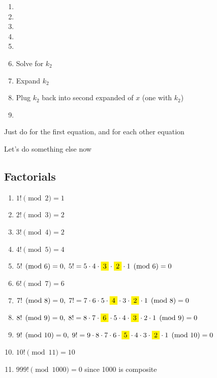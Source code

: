 \documentclass[../../Main.tex]{subfiles}
\begin{document}
\begin{enumerate}
    \item {}
    \item {}
    \item {}
    \item {}
    \item {}
    \item Solve for $k_2$
    \item Expand $k_2$
    \item Plug $k_2$ back into second expanded of $x$ (one with $k_2$)
    \item {}
\end{enumerate}

Just do  for the first equation, and  for each other equation

Let's do something else now

\subsection{Factorials}

\begin{enumerate}
    \item $1! \pmod{2} = 1$
    \item $2! \pmod{3} = 2$
    \item $3! \pmod{4} = 2$
    \item $4! \pmod{5} = 4$
    \item $5! \pmod{6} = 0, \; 5! = 5 \cdot 4 \cdot \yellowbox{3} \cdot \yellowbox{2} \cdot 1 \pmod{6} = 0$
    \item $6! \pmod{7} = 6$
    \item $7! \pmod{8} = 0, \; 7! = 7 \cdot 6 \cdot 5 \cdot \yellowbox{4} \cdot 3 \cdot \yellowbox{2} \cdot 1 \pmod{8} = 0$
    \item $8! \pmod{9} = 0, \; 8! = 8 \cdot 7 \cdot \yellowbox{6} \cdot 5 \cdot 4 \cdot \yellowbox{3} \cdot 2 \cdot 1 \pmod{9} = 0$
    \item $9! \pmod{10} = 0, \; 9! = 9 \cdot 8 \cdot 7 \cdot 6 \cdot \yellowbox{5} \cdot 4 \cdot 3 \cdot \yellowbox{2} \cdot 1 \pmod{10} = 0$
    \item $10! \pmod{11} = 10$
    \item $999! \pmod{1000} = 0$ since 1000 is composite
\end{enumerate}
\end{document}
